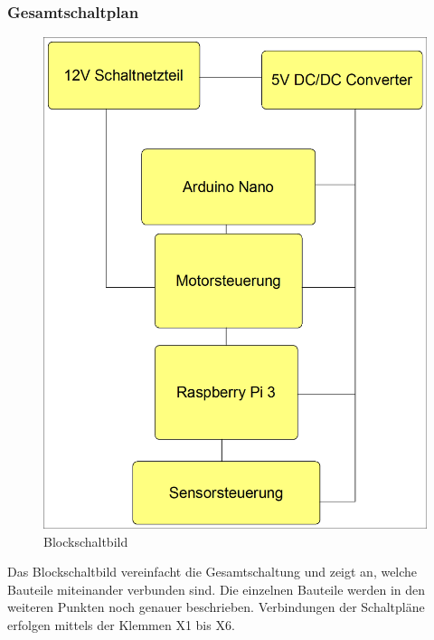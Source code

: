 \subsubsection{Gesamtschaltplan}
\begin{figure}[H] 
\begin{center}

\includegraphics[width=12cm]{Bilder/Schaltplan/Blockschaltbild}
\caption{Blockschaltbild}
\label{Blockschaltbild}

\end{center}
\end{figure}

Das Blockschaltbild vereinfacht die Gesamtschaltung und zeigt an, welche Bauteile miteinander verbunden sind. Die einzelnen Bauteile werden in den weiteren Punkten noch genauer beschrieben.
Verbindungen der Schaltpläne erfolgen mittels der Klemmen X1 bis X6.
 
